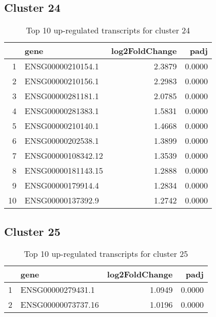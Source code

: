 \documentclass{article}
\begin{document}
\subsection{Cluster 24 }
\begin{table}[H]
\centering
\begin{tabular}{rlrr}
  \hline
 & gene & log2FoldChange & padj \\ 
  \hline
1 & ENSG00000210154.1 & 2.3879 & 0.0000 \\ 
  2 & ENSG00000210156.1 & 2.2983 & 0.0000 \\ 
  3 & ENSG00000281181.1 & 2.0785 & 0.0000 \\ 
  4 & ENSG00000281383.1 & 1.5831 & 0.0000 \\ 
  5 & ENSG00000210140.1 & 1.4668 & 0.0000 \\ 
  6 & ENSG00000202538.1 & 1.3899 & 0.0000 \\ 
  7 & ENSG00000108342.12 & 1.3539 & 0.0000 \\ 
  8 & ENSG00000181143.15 & 1.2888 & 0.0000 \\ 
  9 & ENSG00000179914.4 & 1.2834 & 0.0000 \\ 
  10 & ENSG00000137392.9 & 1.2742 & 0.0000 \\ 
   \hline
\end{tabular}
\caption{Top 10 up-regulated transcripts for cluster 24} 
\label{tab:q3_1_24}
\end{table}
\subsection{Cluster 25 }
\begin{table}[H]
\centering
\begin{tabular}{rlrr}
  \hline
 & gene & log2FoldChange & padj \\ 
  \hline
1 & ENSG00000279431.1 & 1.0949 & 0.0000 \\ 
  2 & ENSG00000073737.16 & 1.0196 & 0.0000 \\ 
   \hline
\end{tabular}
\caption{Top 10 up-regulated transcripts for cluster 25} 
\label{tab:q3_1_25}
\end{table}
\end{document}
